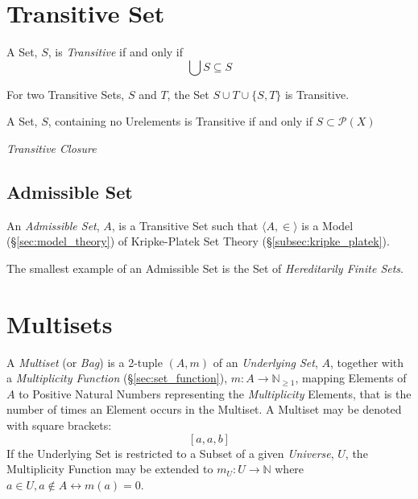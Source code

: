 \documentclass{article}
\begin{document}
\section{Transitive Set}\label{sec:transitive_set}

A Set, $S$, is \emph{Transitive} if and only if
\[
    \bigcup S \subseteq S
\]

For two Transitive Sets, $S$ and $T$, the Set $S \cup T \cup \{S,T\}$
is Transitive.

A Set, $S$, containing no Urelements is Transitive if and only if $S
\subset \mathcal{P}(X)$

\emph{Transitive Closure}



\subsection{Admissible Set}\label{subsec:admissible_set}

An \emph{Admissible Set}, $A$, is a Transitive Set such that $\langle
A, \in \rangle$ is a Model (\S\ref{sec:model_theory}) of Kripke-Platek
Set Theory (\S\ref{subsec:kripke_platek}).

The smallest example of an Admissible Set is the Set of
\emph{Hereditarily Finite Sets}. %



\section{Multisets}\label{sec:multi_sets}

A \emph{Multiset} (or \emph{Bag}) is a 2-tuple $(A,m)$ of an
\emph{Underlying Set}, $A$, together with a \emph{Multiplicity
  Function} (\S\ref{sec:set_function}), $m : A \rightarrow
\mathbb{N}_{\geq 1}$, mapping Elements of $A$ to Positive Natural
Numbers representing the \emph{Multiplicity} Elements, that is the
number of times an Element occurs in the Multiset. A Multiset may be
denoted with square brackets:
\[
    [a,a,b]
\]
If the Underlying Set is restricted to a Subset of a given
\emph{Universe}, $U$, the Multiplicity Function may be extended to
$m_U : U \rightarrow \mathbb{N}$ where $a \in U, a \notin A
\leftrightarrow m(a)=0$.
\end{document}
